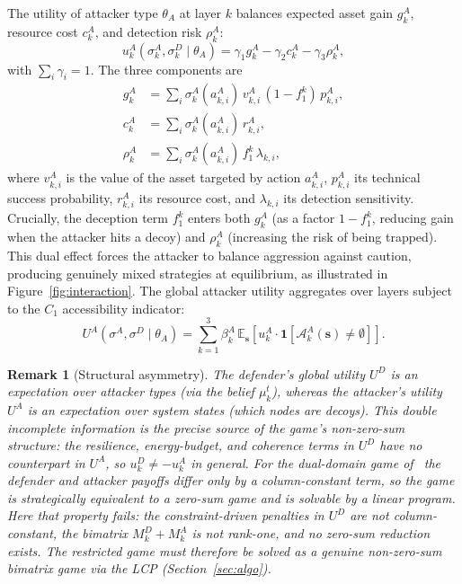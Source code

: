 \documentclass[conference]{IEEEtran}
\newtheorem{remark}{Remark}
\newcommand{\E}{\mathbb{E}}
\newcommand{\indic}{\mathbf{1}}
\begin{document}
The utility of attacker type $\theta_A$ at layer $k$ balances expected asset
gain $g_k^A$, resource cost $c_k^A$, and detection risk $\rho_k^A$:
\begin{equation}
u_k^A(\sigma_k^A,\sigma_k^D\mid\theta_A) =
\gamma_1 g_k^A - \gamma_2 c_k^A - \gamma_3 \rho_k^A,
\label{eq:util_A}
\end{equation}
with $\sum_i\gamma_i=1$. The three components are
\begin{align}
g_k^A &= \sum_i \sigma_k^A(a_{k,i}^A)\,v_{k,i}^A\,(1-f_1^k)\,p_{k,i}^A,
\label{eq:gain}\\
c_k^A &= \sum_i \sigma_k^A(a_{k,i}^A)\,r_{k,i}^A,
\label{eq:acost}\\
\rho_k^A &= \sum_i \sigma_k^A(a_{k,i}^A)\,f_1^k\,\lambda_{k,i},
\label{eq:risk}
\end{align}
where $v_{k,i}^A$ is the value of the asset targeted by action $a_{k,i}^A$,
$p_{k,i}^A$ its technical success probability, $r_{k,i}^A$ its resource cost,
and $\lambda_{k,i}$ its detection sensitivity. Crucially, the deception term
$f_1^k$ enters both $g_k^A$ (as a factor $1-f_1^k$, reducing gain when the
attacker hits a decoy) and $\rho_k^A$ (increasing the risk of being trapped).
This dual effect forces
the attacker to balance aggression against caution, producing genuinely mixed
strategies at equilibrium, as illustrated in Figure~\ref{fig:interaction}. The global attacker utility aggregates over layers
subject to the $C_1$ accessibility indicator:
\begin{equation}
U^A(\sigma^A,\sigma^D\mid\theta_A) = \sum_{k=1}^3 \beta_k^A\,
\E_{\mathbf{s}}\!\left[u_k^A\cdot\indic[\mathcal{A}_k^A(\mathbf{s})\neq\emptyset]
\right].
\label{eq:util_A_global}
\end{equation}

\begin{remark}[Structural asymmetry]
\label{rem:asymmetry}
The defender's global utility $U^D$ is an expectation over attacker
\emph{types} (via the belief $\mu_k^t$), whereas the attacker's utility $U^A$ is
an expectation over system \emph{states} (which nodes are decoys). This double
incomplete information is the precise source of the game's non-zero-sum
structure: the resilience, energy-budget, and coherence terms in $U^D$ have no
counterpart in $U^A$, so $u_k^D \neq -u_k^A$ in general. For the dual-domain
game of~\cite{asghar2025} the defender and attacker payoffs differ only by a
column-constant term, so the game is \emph{strategically equivalent} to a
zero-sum game and is solvable by a linear program. Here that property fails: the
constraint-driven penalties in $U^D$ are not column-constant, the bimatrix
$M_k^D + M_k^A$  is not rank-one, and no zero-sum reduction exists. The
restricted game must therefore be solved as a genuine non-zero-sum bimatrix
game via the LCP (Section~\ref{sec:algo}).
\end{remark}
\end{document}

